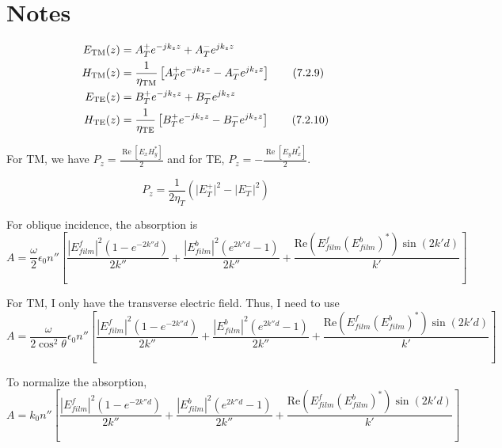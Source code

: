 \documentclass[12pt]{article}
\date{\today }
\author{
Paul W. Leu\\
University of Pittsburgh\\
Pittsburgh, PA}
\numberwithin{equation}{section}
\begin{document}
\tableofcontents

\section{Notes}




\begin{align}
    E_{\text{TM}}(z) &= A_T^+ e^{-j k_z z} + A_T^- e^{j k_z z} \notag \\
    H_{\text{TM}}(z) &= \frac{1}{\eta_{\text{TM}}} \left[ A_T^+ e^{-j k_z z} - A_T^- e^{j k_z z} \right] \tag{7.2.9} \\
    E_{\text{TE}}(z) &= B_T^+ e^{-j k_z z} + B_T^- e^{j k_z z} \notag \\
    H_{\text{TE}}(z) &= \frac{1}{\eta_{\text{TE}}} \left[ B_T^+ e^{-j k_z z} - B_T^- e^{j k_z z} \right] \tag{7.2.10}
\end{align}

For TM, we have 
$P_z = \frac{\operatorname{Re}[E_x H_y^*]}{2}$
and for TE, 
$P_z = -\frac{\operatorname{Re}[E_y H_x^*]}{2}.$

\begin{equation}
    P_z = \frac{1}{2\eta_T} \left( \lvert E_T^+ \rvert^2 - \lvert E_T^- \rvert^2 \right) \tag{7.3.17}
\end{equation}


For oblique incidence, the absorption is
\begin{equation}
A = \frac{\omega}{2} \epsilon_0 n'' \left[ 
\frac{|E_{film}^f|^2 (1 - e^{-2k''d})}{2k''} 
+ \frac{|E_{film}^b|^2 (e^{2k''d} - 1)}{2k''} 
+ \frac{\text{Re}(E_{film}^f (E_{film}^b)^*) \sin(2k'd)}{k'} 
\right]
\end{equation}

For TM, I only have the transverse electric field.  Thus, I need to use 
\begin{equation}
A = \frac{\omega}{2 \cos^2 \theta} \epsilon_0 n'' \left[ 
\frac{|E_{film}^f|^2 (1 - e^{-2k''d})}{2k''} 
+ \frac{|E_{film}^b|^2 (e^{2k''d} - 1)}{2k''} 
+ \frac{\text{Re}(E_{film}^f (E_{film}^b)^*) \sin(2k'd)}{k'} 
\right]
\end{equation}

To normalize the absorption, 
\begin{equation}
A = k_0 n'' \left[ 
\frac{|E_{film}^f|^2 (1 - e^{-2k''d})}{2k''} 
+ \frac{|E_{film}^b|^2 (e^{2k''d} - 1)}{2k''} 
+ \frac{\text{Re}(E_{film}^f (E_{film}^b)^*) \sin(2k'd)}{k'} 
\right]
\end{equation}
\end{document}
